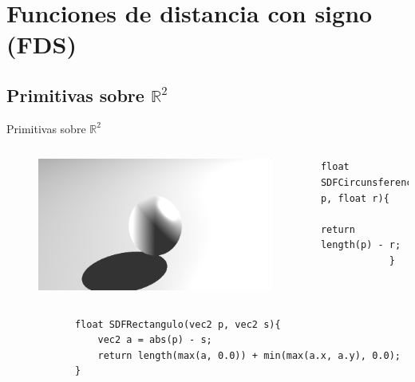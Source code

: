 \section{Funciones de distancia con signo (FDS)}

\SectionPage

\subsection{Primitivas sobre \(\mathbb{R}^2\)}
\begin{frame}[fragile]{Primitivas sobre \(\mathbb{R}^2\)}

    \begin{columns}
        \column{1.5in}
            \begin{figure}[H]
              \centering
              \includegraphics[width=1.0\textwidth]{imagenes/lightmodel/sombra_dura.png}
            \end{figure}
        
        \column{2.5in}
        
            \begin{lstlisting}[boxpos=t]
            float SDFCircunsferencia(vec2 p, float r){
                return length(p) - r;
            }
            \end{lstlisting}
        
    \end{columns}
    
    \begin{columns}
        \column{2.5in}
            \begin{lstlisting}
            float SDFRectangulo(vec2 p, vec2 s){
                vec2 a = abs(p) - s;
                return length(max(a, 0.0)) + min(max(a.x, a.y), 0.0);
            }
            \end{lstlisting}
    

\end{columns}
\end{frame}
